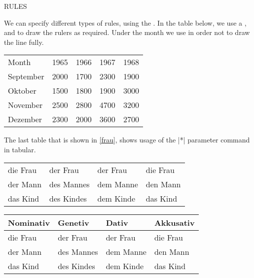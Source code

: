 \clearpage

{\Large RULES}

We can specify different types of rules, using the . In the table below, we use a ,  and  to draw the rulers as required. Under the month we use  in order not to draw the line fully.

{    \centering
    \label{tab:linien}
    \begin{tabular}{@{}l*{4}{l}@{}}
      \toprule
        Month & 1965 & 1966 & 1967 & 1968 \\
      \cmidrule(r){1-1}\cmidrule(lr){2-2}\cmidrule(lr){3-3}\cmidrule(lr){4-4}%
        \cmidrule(l){5-5}
        September & 2000 & 1700 & 2300 & 1900 \\
        Oktober   & 1500 & 1800 & 1900 & 3000 \\
        November  & 2500 & 2800 & 4700 & 3200 \\
        Dezember  & 2300 & 2000 & 3600 & 2700 \\
      \bottomrule
    \end{tabular}
}
  
\bigskip
 \pagebreak


The last table that is shown in \ref{frau}, shows usage of the |*| parameter command in tabular.


{    \centering
    \label{tab:mehrspaltig}
    \begin{tabular}{*{4}{l}}
      die Frau & der Frau   & der Frau  & die Frau \\
      der Mann & des Mannes & dem Manne & den Mann \\
      das Kind & des Kindes & dem Kinde & das Kind
    \end{tabular}
  \label{frau}
 }



{    \centering
    \label{tab:tabellensatz}
    \begin{tabular}{@{}*{4}{l}@{}}
      \toprule
        Nominativ & Genetiv & Dativ & Akkusativ \\
      \midrule
        die Frau & der Frau   & der Frau  & die Frau \\
        der Mann & des Mannes & dem Manne & den Mann \\
        das Kind & des Kindes & dem Kinde & das Kind \\
      \bottomrule
    \end{tabular}
} 


